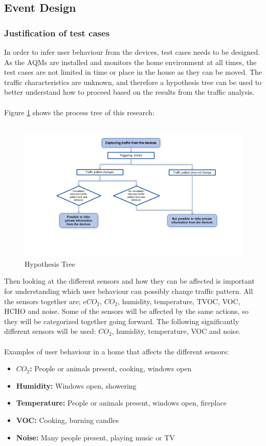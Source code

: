 \subsection{Event Design}
\subsubsection{Justification of test cases}
In order to infer user behaviour from the devices, test cases needs to be designed. As the AQMs are installed and monitors the home environment at all times, the test cases are not limited in time or place in the house as they can be moved. The traffic characteristics are unknown, and therefore a hypothesis tree can be used to better understand how to proceed based on the results from the traffic analysis. 
\\\\
Figure \ref{fig:HypothesisTree} shows the process tree of this research:
\\\\
\begin{figure} [H]
    \centering
    \includegraphics[width=1.5\textwidth,left]{figures/HypothesisTree.png}
    \caption{Hypothesis Tree}
    \label{fig:HypothesisTree}
\end{figure}

Then looking at the different sensors and how they can be affected is important for understanding which user behaviour can possibly change traffic pattern. All the sensors together are; \(eCO_2\), \(CO_2\), humidity, temperature, TVOC, VOC, HCHO and noise. Some of the sensors will be affected by the same actions, so they will be categorized together going forward. The following significantly different sensors will be used: \(CO_2\), humidity, temperature, VOC and noise. 
\\\\
Examples of user behaviour in a home that affects the different sensors:
\begin{itemize}
    \item \textbf{\(CO_2\):} People or animals present, cooking, windows open
    \item \textbf{Humidity:} Windows open, showering
    \item \textbf{Temperature:} People or animals present, windows open, fireplace
    \item \textbf{VOC:} Cooking, burning candles
    \item \textbf{Noise:} Many people present, playing music or TV
\end{itemize}

